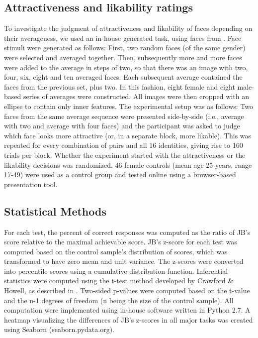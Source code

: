 \documentclass[fleqn,10pt]{SelfArx} %
\begin{document}
\subsection*{Attractiveness and likability ratings}
To investigate the judgment of attractiveness and likability of faces depending on their averageness, we used an in-house generated task, using faces from \citet{DeBruine2017}. Face stimuli were generated as follows: First, two random faces (of the same gender) were selected and averaged together. Then, subsequently more and more faces were added to the average in steps of two, so that there was an image with two, four, six, eight and ten averaged faces. Each subsequent average contained the faces from the previous set, plus two. In this fashion, eight female and eight male-based series of averages were constructed. All images were then cropped with an ellipse to contain only inner features.
The experimental setup was as follows: Two faces from the same average sequence were presented side-by-side (i.e., average with two and average with four faces) and the participant was asked to judge which face looks more attractive (or, in a separate block, more likable). This was repeated for every combination of pairs and all 16 identities, giving rise to 160 trials per block. Whether the experiment started with the attractiveness or the likability decisions was randomized. 46 female controls (mean age 25 years, range 17-49) were used as a control group and tested online using a browser-based presentation tool.

\subsection*{Statistical Methods}
For each test, the percent of correct responses was computed as the ratio of JB’s score relative to the maximal achievable score. JB’s z-score for each test was computed based on the control sample’s distribution of scores, which was transformed to have zero mean and unit variance. The z-scores were converted into percentile scores using a cumulative distribution function. Inferential statistics were computed using the t-test method developed by Crawford \& Howell, as described in \citet{Crawford_2009}. Two-sided p-values were computed based on the t-value and the n-1 degrees of freedom (n being the size of the control sample). All computation were implemented using in-house software written in Python 2.7. A heatmap visualizing the differences of JB’s z-scores in all major tasks was created using Seaborn (seaborn.pydata.org).
\end{document}
